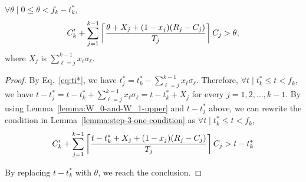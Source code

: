\begin{Lemma}
\label{lemma:step-3-ceiling-condition}
$\forall \theta \mid 0 \leq \theta < f_k-t_k^*$,
\begin{equation}
\label{eq:exec_plus_idle-almost-final-before-replacing-sigma} 
C_k'+\sum_{j=1}^{k-1} \ceiling{\frac{\theta+X_j+(1-x_j)(R_j-C_j)}{T_j}} C_j > \theta,
\end{equation}
where $X_j$ is $\sum_{\ell=j}^{k-1} x_\ell\sigma_\ell$. 
\end{Lemma}
\begin{proof}
  By Eq.~\eqref{eq:ti*}, we have $t_j^* = t_k^* - \sum_{\ell=j}^{k-1}
  x_\ell\sigma_\ell$. Therefore, $\forall t \mid t_k^* \leq t < f_k$,
  we have $t-t_j^* = t - t_k^* + \sum_{\ell=j}^{k-1}
  x_\ell\sigma_\ell = t-t_k^* + X_j$ for every $j=1,2,\ldots,k-1$. By using Lemma~\ref{lemma:W_0-and-W_1-upper} and $t-t_j^*$ above, we can rewrite the condition in Lemma~\ref{lemma:step-3-one-condition} as $\forall t \mid t_k^* \leq t < f_k$,
\begin{equation*}
C_k'+\sum_{j=1}^{k-1} \left\lceil{\frac{t-t_k^*+X_j+(1-x_j)(R_j-C_j)}{T_j}}\right\rceil C_j > t-t_k^*
\end{equation*}

  By replacing $t-t_k^*$ with $\theta$, we reach the conclusion.
\end{proof}


